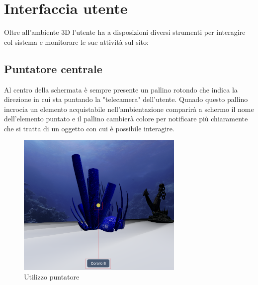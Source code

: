 \section{Interfaccia utente}
Oltre all'ambiente 3D l'utente ha a disposizioni diversi strumenti per interagire col sistema e monitorare le sue attività sul sito:
\subsection{Puntatore centrale}
Al centro della schermata è sempre presente un pallino rotondo che indica la direzione in cui sta puntando la "telecamera" dell'utente. Qunado questo pallino incrocia un elemento acquistabile nell'ambientazione comparirà a schermo il nome dell'elemento puntato e il pallino cambierà colore per notificare più chiaramente che si tratta di un oggetto con cui è possibile interagire.
\begin{figure}
  \renewcommand{\thefigure}{1}
\begin{center}
  \includegraphics[width=8cm]{./res/images/puntatore.png}
 \end{center}
 \caption{Utilizzo puntatore}
  \label{Utilizzo puntatore}
\end{figure}

